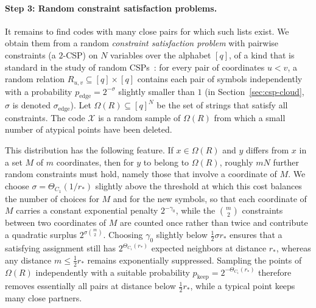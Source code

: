 \documentclass[11pt]{article}
\theoremstyle{definition}
\theoremstyle{remark}
\begin{document}
\paragraph{Step 3: Random constraint satisfaction problems.}
It remains to find codes with many close pairs for which such lists exist. We obtain them from a random \emph{constraint satisfaction problem} with pairwise constraints (a $2$-CSP) on $N$ variables over the alphabet $[q]$, of a kind that is standard in the study of random CSPs~\cite{achlioptas2001random,molloy2003models}: for every pair of coordinates $u < v$, a random relation $R_{u, v} \subseteq [q] \times [q]$ contains each pair of symbols independently with a probability $p_{\mathrm{edge}} = 2^{-\sigma}$ slightly smaller than $1$ (in Section~\ref{sec:csp-cloud}, $\sigma$ is denoted $\sigma_{\mathrm{edge}}$). Let $\Omega(R) \subseteq [q]^N$ be the set of strings that satisfy all constraints. The code $\mathcal{X}$ is a random sample of $\Omega(R)$ from which a small number of atypical points have been deleted.

This distribution has the following feature. If $x \in \Omega(R)$ and $y$ differs from $x$ in a set $M$ of $m$ coordinates, then for $y$ to belong to $\Omega(R)$, roughly $m N$ further random constraints must hold, namely those that involve a coordinate of $M$. We choose $\sigma = \Theta_{C_1}(1/r_*)$ slightly above the threshold at which this cost balances the number of choices for $M$ and for the new symbols, so that each coordinate of $M$ carries a constant exponential penalty $2^{-\gamma_0}$, while the $\binom{m}{2}$ constraints between two coordinates of $M$ are counted once rather than twice and contribute a quadratic surplus $2^{\sigma \binom{m}{2}}$. Choosing $\gamma_0$ slightly below $\frac{1}{2}\sigma r_*$ ensures that a satisfying assignment still has $2^{\Theta_{C_1}(r_*)}$ expected neighbors at distance $r_*$, whereas any distance $m \le \frac{1}{2} r_*$ remains exponentially suppressed. Sampling the points of $\Omega(R)$ independently with a suitable probability $p_{\mathrm{keep}} = 2^{-\Theta_{C_1}(r_*)}$ therefore removes essentially all pairs at distance below $\frac{1}{2} r_*$, while a typical point keeps many close partners.
\end{document}
